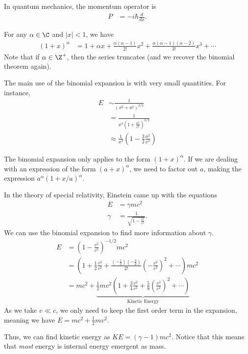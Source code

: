 \documentclass[10pt]{mypackage}
\begin{document}
\begin{remark}
  In quantum mechanics, the momentum operator is
  \begin{align*}
    P &= -i\hbar \frac{d}{dx}.
  \end{align*}
\end{remark}
\begin{example}
  For any $\alpha \in \C$ and $|x| < 1$, we have
  \begin{align*}
    \left(1+x\right)^{\alpha} &= 1 + \alpha x + \frac{\alpha\left(\alpha - 1\right)}{2!}x^2 + \frac{\alpha\left(\alpha - 1\right)\left(\alpha - 2\right)}{3!}x^3 + \cdots
  \end{align*}
  Note that if $\alpha \in \Z^{+}$, then the series truncates (and we recover the binomial theorem again).\newline

  The main use of the binomial expansion is with very small quantities. For instance,
  \begin{align*}
    E &\sim \frac{1}{\left(x^2 + a^2\right)^{3/2}}\\
      &= \frac{1}{x^3\left(1 + \frac{a^2}{x^2}\right)^{3/2}}\\
      &\approx \frac{1}{x^3}\left(1-\frac{3}{2}\frac{a^2}{x^2}\right)\tag*{For $x \gg a$}
  \end{align*}
\end{example}
\begin{remark}
  The binomial expansion only applies to the form $\left(1 + x\right)^{\alpha}$. If we are dealing with an expression of the form $\left(a + x\right)^{\alpha}$, we need to factor out $a$, making the expression $a^{\alpha}\left(1 + x/a\right)^{\alpha}$.
\end{remark}
\begin{example}
  In the theory of special relativity, Einstein came up with the equations
  \begin{align*}
    E &= \gamma mc^2\\
    \gamma &= \frac{1}{\sqrt{1 - \frac{v^2}{c^2}}}.
  \end{align*}
  We can use the binomial expansion to find more information about $\gamma$.
  \begin{align*}
    E &= \left(1-\frac{v^2}{c^2}\right)^{-1/2}mc^2\\
      &= \left(1 + \frac{1}{2}\frac{v^2}{c^2} + \frac{\left(-\frac{1}{2}\right)\left(-\frac{3}{2}\right)}{2!}\left(-\frac{v^2}{c^2}\right)^{2} + \cdots\right)mc^2\\
      &= mc^2 + \underbrace{\frac{1}{2}mv^2\left(1 + \frac{3}{4}\frac{v^2}{c^2} + \frac{5}{8}\left(\frac{v^2}{c^2}\right)^{2} + \cdots\right)}_{\text{Kinetic Energy}}
  \end{align*}
  As we take $v \ll c$, we only need to keep the first order term in the expansion, meaning we have $E = mc^2 + \frac{1}{2}mv^2$.\newline

  Thus, we can find kinetic energy as $KE = \left(\gamma - 1\right)mc^2$. Notice that this means that \textit{most} energy is internal energy emergent as mass.
\end{example}
\end{document}
